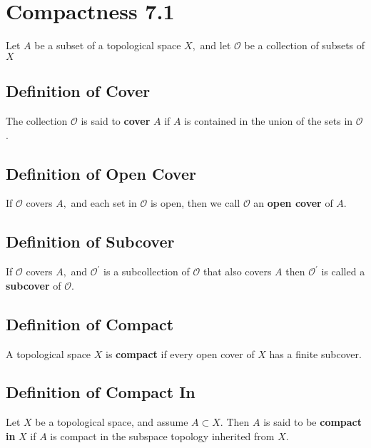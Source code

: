 \documentclass[12pt]{article}
\begin{document}
\pagestyle{fancy}  
\lfoot{} \cfoot{} \rfoot{}

\setcounter{section}{6}

\section{Compactness 7.1}
	Let $A$ be a subset of a topological space $X ,$ and let $\mathcal { O }$ be a collection of subsets of $ X $
	\subsection{Definition of Cover}
		The collection $\mathcal { O }$ is said to \textbf{cover} $A$ if $A$ is
		contained in the union of the sets in $\mathcal { O }$ .
	\subsection{Definition of Open Cover}
		If $\mathcal { O }$ covers $A ,$ and each set in $\mathcal { O }$ is open, then we call $\mathcal { O }$ an \textbf{ open cover} of $A .$ 
	\subsection{Definition of Subcover}
		If $\mathcal { O }$ covers $A ,$ and $\mathcal { O } ^ { \prime }$ is a subcollection of $\mathcal { O }$ that also covers $A$
		then $\mathcal { O } ^ { \prime }$ is called a \textbf{subcover} of $\mathcal { O } .$\\
		
	\subsection{Definition of Compact}
		A topological space $X$ is \textbf{compact} if every open cover of $ X $ has a finite subcover.
	
	\subsection{Definition of Compact In}
		Let $X$ be a topological space, and assume $A \subset X .$ Then $A$ is said to be \textbf{compact in} $X$ if $A$ is compact in the subspace topology inherited from $X .$ 
		
	
\end{document}
